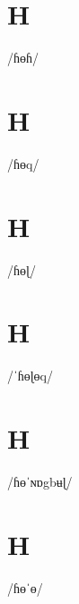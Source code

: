 \documentclass[10pt,a4paper,twoside]{book}
\begin{document}
\section*{H}

\begin{multicols}{3}
 {/ɦɵɦ/} {}
\end{multicols}

\section*{H}

\begin{multicols}{3}
 {/ɦɵq/} {}
\end{multicols}

\section*{H}

\begin{multicols}{3}
 {/ɦɵɭ/} {}
\end{multicols}

\section*{H}

\begin{multicols}{3}
 {/ˈɦɵɭɵq/} {}
\end{multicols}

\section*{H}

\begin{multicols}{3}
 {/ɦɵˈɴɒgbʉɭ/} {}
\end{multicols}

\section*{H}

\begin{multicols}{3}
 {/ɦɵˈɵ/} {}
\end{multicols}
\end{document}
